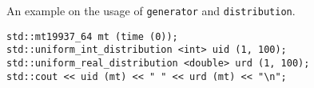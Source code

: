 An example on the usage of \texttt{generator} and \texttt{distribution}.

\begin{lstlisting}
std::mt19937_64 mt (time (0));
std::uniform_int_distribution <int> uid (1, 100);
std::uniform_real_distribution <double> urd (1, 100);
std::cout << uid (mt) << " " << urd (mt) << "\n";
\end{lstlisting}


